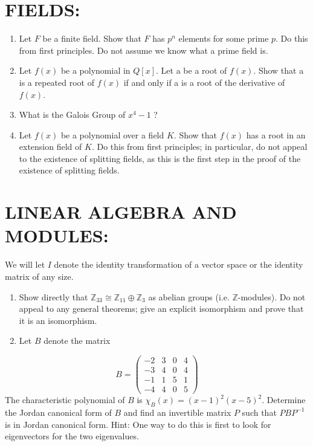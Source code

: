 \documentclass[10pt]{article}
\begin{document}
\section{FIELDS:}
\begin{enumerate}
  \item Let $F$ be a finite field. Show that $F$ has $p^{n}$ elements for some prime $p$. Do this from first principles. Do not assume we know what a prime field is.

  \item Let $f(x)$ be a polynomial in $Q[x]$. Let a be a root of $f(x)$. Show that a is a repeated root of $f(x)$ if and only if a is a root of the derivative of $f(x)$.

  \item What is the Galois Group of $x^{4}-1$ ?

  \item Let $f(x)$ be a polynomial over a field $K$. Show that $f(x)$ has a root in an extension field of $K$. Do this from first principles; in particular, do not appeal to the existence of splitting fields, as this is the first step in the proof of the existence of splitting fields.

\end{enumerate}
\section{LINEAR ALGEBRA AND MODULES:}
We will let $I$ denote the identity transformation of a vector space or the identity matrix of any size.

\begin{enumerate}
  \item Show directly that $\mathbb{Z}_{33} \cong \mathbb{Z}_{11} \oplus \mathbb{Z}_{3}$ as abelian groups (i.e. $\mathbb{Z}$-modules). Do not appeal to any general theorems; give an explicit isomorphism and prove that it is an isomorphism.

  \item Let $B$ denote the matrix

\end{enumerate}
$$
B=\left(\begin{array}{cccc}
-2 & 3 & 0 & 4 \\
-3 & 4 & 0 & 4 \\
-1 & 1 & 5 & 1 \\
-4 & 4 & 0 & 5
\end{array}\right)
$$
The characteristic polynomial of $B$ is $\chi_{B}(x)=(x-1)^{2}(x-5)^{2}$. Determine the Jordan canonical form of $B$ and find an invertible matrix $P$ such that $P B P^{-1}$ is in Jordan canonical form. Hint: One way to do this is first to look for eigenvectors for the two eigenvalues.
\end{document}
